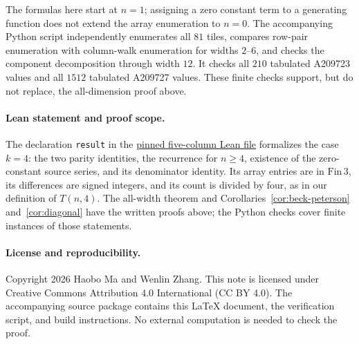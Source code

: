 \documentclass[11pt]{article}
\begin{document}
The formulas here start at $n=1$; assigning a zero constant term to a
generating function does not extend the array enumeration to $n=0$.
The accompanying Python script independently enumerates all $81$ tiles,
compares row-pair enumeration with column-walk enumeration for widths
$2$--$6$, and checks the component decomposition through width $12$.
It checks all $210$ tabulated A209723 values and all $1512$ tabulated
A209727 values. These finite checks support, but do not replace, the
all-dimension proof above.

\paragraph{Lean statement and proof scope.}
The declaration \texttt{result} in the
\href{https://github.com/the-omega-institute/trureturing/blob/cdafeab0d44da2b6840cfc802535d2f94a146fad/D5/S3/Combinatorics/Graph/Pressure/HardinBarkerA209723EdgeDifferences.lean}{pinned five-column Lean file}
formalizes the case $k=4$: the two parity identities,
the recurrence for $n\geq4$, existence of the zero-constant source series,
and its denominator identity. Its array entries are in $\mathrm{Fin}\,3$,
its differences are signed integers, and its count is divided by four,
as in our definition of $T(n,4)$.
The all-width theorem and Corollaries~\ref{cor:beck-peterson}
and~\ref{cor:diagonal} have the written proofs above; the Python checks
cover finite instances of those statements.

\paragraph{License and reproducibility.}
Copyright 2026 Haobo Ma and Wenlin Zhang.
This note is licensed under Creative Commons Attribution 4.0 International
(CC BY 4.0). The accompanying source package contains this LaTeX document,
the verification script, and build instructions. No external computation
is needed to check the proof.
\end{document}
